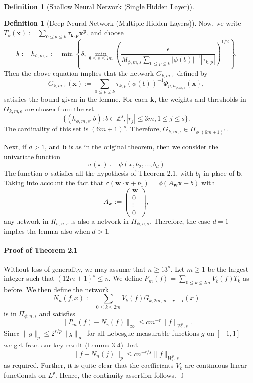 \documentclass[11pt,a4paper]{article}
\theoremstyle{plain}
\theoremstyle{definition}
\newtheorem{definition}[theorem]{Definition}
\theoremstyle{remark}
\begin{document}
\begin{definition}[Shallow Neural Network (Single Hidden Layer)]
\begin{definition}[Deep Neural Network (Multiple Hidden Layers)]
Now, we write \( T_k(\mathbf{x}) := \sum_{0\leq p \leq k} \tau_{ \mathbf{k},\mathbf{p} } \mathbf{x}^{\mathbf{p}} \), and choose
\[
h := h_{\phi,m,s} := \min \left\{ \delta, \min_{0\leq s \leq 2m} \left( \frac{\epsilon}{M_{\phi,m,s} \sum_{0 \leq p \leq k} |\phi(b)|^{-1} |\tau_{k,p}|} \right)^{1/2} \right\}.
\]
Then the above equation implies that the network \( G_{k,m,\epsilon} \) defined by
\[
G_{k,m,\epsilon}(\mathbf{x}) := \sum_{0 \leq p \leq k} \tau_{k,p}(\phi(b))^{-1} \Phi_{p,h_{\phi,m,s}}(\mathbf{x}),
\]
satisfies the bound given in the lemme. For each \( \mathbf{k} \), the weights and thresholds in \( G_{k,m,\epsilon} \) are chosen from the set
\[
\{ (h_{\phi,m,s}, b) : b \in \mathbb{Z}^s, |r_{j}| \leq 3m, 1 \leq j \leq s \}.
\]
The cardinality of this set is \( (6m + 1)^s \). Therefore, \( G_{k,m,\epsilon} \in \Pi_{\phi;(6m+1)^s} \).

Next, if \(d >1\), and \(\mathbf{b}\) is as in the original theorem, then we consider the univariate function
\[
    \sigma (x) := \phi (x, b_2, \ldots, b_d)
\]
The function \( \sigma \) satisfies all the hypothesis of Theorem 2.1, with \( b_1 \) in place of \( \mathbf{b}  \). Taking into account the fact that \( \sigma(\mathbf{w} \cdot \mathbf{x} + b_1) = \phi(A_{\mathbf{w}}\mathbf{x} + b) \) with
\[
A_{\mathbf{w}} := \begin{pmatrix}
\mathbf{w} \\
0 \\
\vdots \\
0
\end{pmatrix},
\]
any network in \( \Pi_{\sigma;n,s} \) is also a network in \( \Pi_{\phi;n,s} \). Therefore, the case \( d = 1 \) implies the lemma also when \( d > 1 \).

\paragraph[short]{Proof of Theorem 2.1}

Without loss of generality, we may assume that \( n \geq 13^s \). Let \( m \geq 1 \) be the largest integer such that \( (12m + 1)^s \leq n \). We define \( P_m(f) = \sum_{0 \leq k \leq 2m} V_k(f)T_k \) as before. We then define the network
\[
N_n(f, x) := \sum_{0 \leq k \leq 2m} V_k(f)G_{k,2m,m-r-\alpha}(x)
\]
is in \( \Pi_{\phi;n,s} \) and satisfies
\[
\| P_m(f) - N_n(f) \|_{\infty} \leq cm^{-r} \| f \|_{W_r^p, s}.
\]
Since \( \| g \|_p \leq 2^{s/p} \| g \|_{\infty} \) for all Lebesgue measurable functions \( g \) on \( [-1,1] \) we get from our key result (Lemma 3.4) that
\[
\| f - N_n(f) \|_p \leq cn^{-r/s} \| f \|_{W_r^p, s}
\]
as required. Further, it is quite clear that the coefficients \( V_k \) are continuous linear functionals on \( L^p \). Hence, the continuity assertion follows. \qed


\end{definition}
\end{definition}
\end{document}
